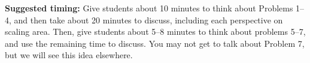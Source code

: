 \documentclass[nooutcomes,noauthor, handout]{ximera}
\begin{document}
\begin{instructorNotes}
{\bf Suggested timing:} Give students about 10 minutes to think about Problems 1--4, and then take about 20 minutes to discuss, including each perspective on scaling area. Then, give students about 5--8 minutes to think about problems 5--7, and use the remaining time to discuss. You may not get to talk about Problem 7, but we will see this idea elsewhere.

 
 



\end{instructorNotes}
\end{document}
